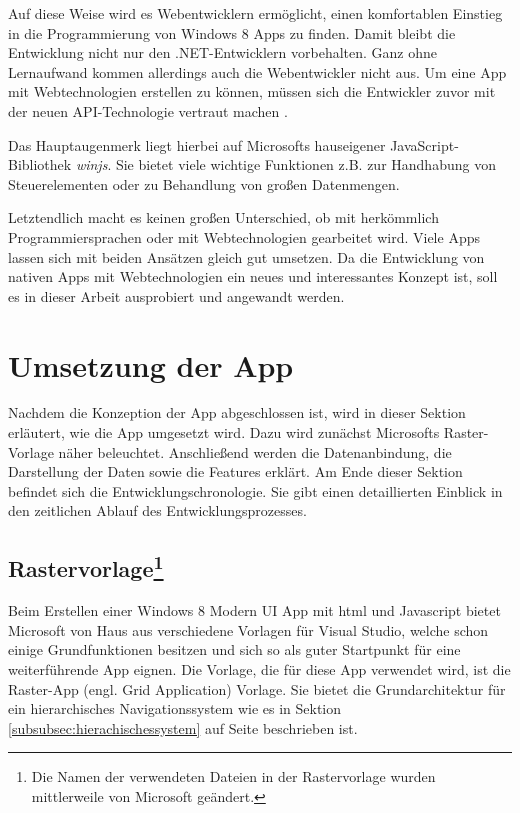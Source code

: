 \documentclass[12pt,a4paper,bibtotoc,abstracton]{scrartcl}
\begin{document}
Auf diese Weise wird es Webentwicklern ermöglicht, einen komfortablen Einstieg in die Programmierung von Windows 8 Apps zu finden. Damit bleibt die Entwicklung nicht nur den .NET-Entwicklern vorbehalten. Ganz ohne Lernaufwand kommen allerdings auch die Webentwickler nicht aus. Um eine App mit Webtechnologien erstellen zu können, müssen sich die Entwickler zuvor mit der neuen API-Technologie vertraut machen \citep{Bleske2012}.

Das Hauptaugenmerk liegt hierbei auf Microsofts hauseigener JavaScript-Bibliothek \textit{\ac{winjs}}. Sie bietet viele wichtige Funktionen z.B. zur Handhabung von Steuerelementen oder zu Behandlung von großen Datenmengen. 

Letztendlich macht es keinen großen Unterschied, ob mit herkömmlich Programmiersprachen oder mit Webtechnologien gearbeitet wird. Viele Apps lassen sich mit beiden Ansätzen gleich gut umsetzen. Da die Entwicklung von nativen Apps mit Webtechnologien ein neues und interessantes Konzept ist, soll es in dieser Arbeit ausprobiert und angewandt werden.

\newpage
\section{Umsetzung der App}
\label{sec:umsetzungderapp}
Nachdem die Konzeption der App abgeschlossen ist, wird in dieser Sektion erläutert, wie die App umgesetzt wird. Dazu wird zunächst Microsofts Raster-Vorlage näher beleuchtet. Anschließend werden die Datenanbindung, die Darstellung der Daten sowie die Features erklärt. Am Ende dieser Sektion befindet sich die Entwicklungschronologie. Sie gibt einen detaillierten Einblick in den zeitlichen Ablauf des Entwicklungsprozesses.

\subsection[Rastervorlage] {Rastervorlage\footnote{Die Namen der verwendeten Dateien in der Rastervorlage wurden mittlerweile von Microsoft geändert.}}
\label{subsec:rastervorlage}
Beim Erstellen einer Windows 8 Modern UI App mit \ac{html} und Javascript bietet Microsoft von Haus aus verschiedene Vorlagen für Visual Studio, welche schon einige Grundfunktionen besitzen und sich so als guter Startpunkt für eine weiterführende App eignen. Die Vorlage, die für diese App verwendet wird, ist die Raster-App (engl. Grid Application) Vorlage. Sie bietet die Grundarchitektur für ein hierarchisches Navigationssystem wie es in Sektion \ref{subsubsec:hierachischessystem} auf Seite \pageref{subsubsec:hierachischessystem} beschrieben ist.
\end{document}
